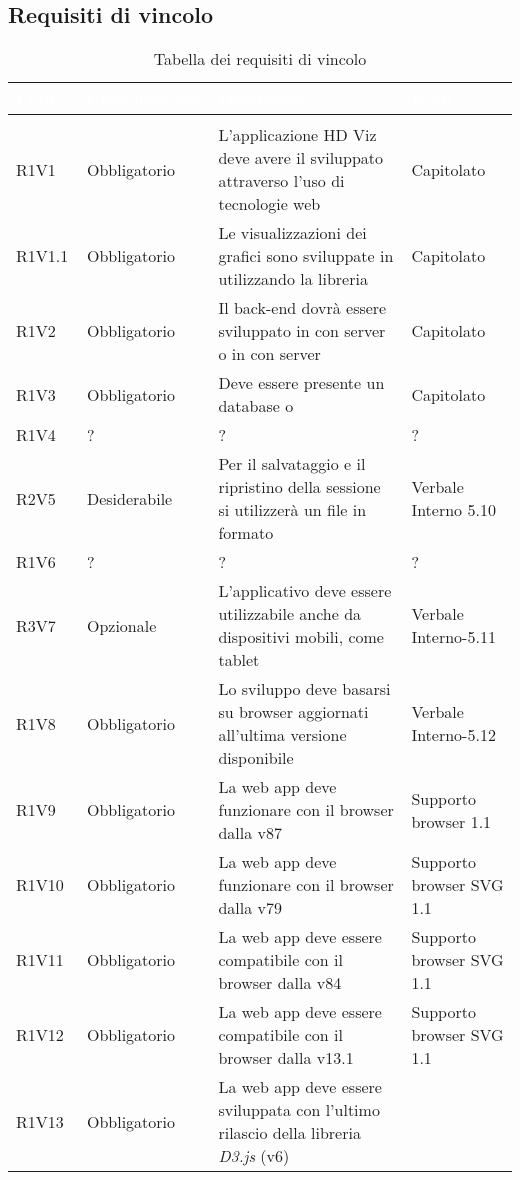 \subsection{Requisiti di vincolo}
\renewcommand{\arraystretch}{1.5}
\begin{center}
\begin{longtable}{C{2cm} | C{3cm} | C{7cm} | C{3.3cm}}
		\textcolor{white}{\textbf{Codice}} & 
		\textcolor{white}{\textbf{Classificazione}} & 
		\textcolor{white}{\textbf{Descrizione}} & 
		\textcolor{white}{\textbf{Fonti}} \\
		\endfirsthead
	    \\
	    \endfoot
	    \caption{Tabella dei requisiti di vincolo}
	    \endlastfoot

R1V1 & Obbligatorio & L'applicazione HD Viz deve avere il  sviluppato attraverso l'uso di tecnologie web & Capitolato \\
R1V1.1 & Obbligatorio & Le visualizzazioni dei grafici sono sviluppate in  utilizzando la libreria  & Capitolato\\
R1V2 & Obbligatorio & Il back-end dovrà essere sviluppato in  con server  o in  con server  & Capitolato \\
R1V3 & Obbligatorio & Deve essere presente un database  o  & Capitolato\\
R1V4 & ? & ? & ?\\
R2V5 & Desiderabile & Per il salvataggio e il ripristino della sessione si utilizzerà un file in formato  & Verbale Interno 5.10\\

R1V6 & ? & ? & ? \\

R3V7 & Opzionale & L'applicativo deve essere utilizzabile anche da dispositivi mobili, come tablet & Verbale Interno-5.11\\
R1V8 & Obbligatorio & Lo sviluppo deve basarsi su browser aggiornati all'ultima versione disponibile & Verbale Interno-5.12\\
R1V9 & Obbligatorio & La web app deve funzionare con il browser  dalla v87 & Supporto browser  1.1 \\
R1V10 & Obbligatorio & La web app deve funzionare con il browser  dalla v79 & Supporto browser SVG 1.1 \\
R1V11 & Obbligatorio & La web app deve essere compatibile con il browser  dalla v84 & Supporto browser SVG 1.1\\
R1V12 & Obbligatorio & La web app deve essere compatibile con il browser  dalla v13.1 & Supporto browser SVG 1.1\\
R1V13 & Obbligatorio & La web app deve essere sviluppata con l'ultimo rilascio della libreria \textit{D3.js} (v6) & \\



\end{longtable}
\end{center}